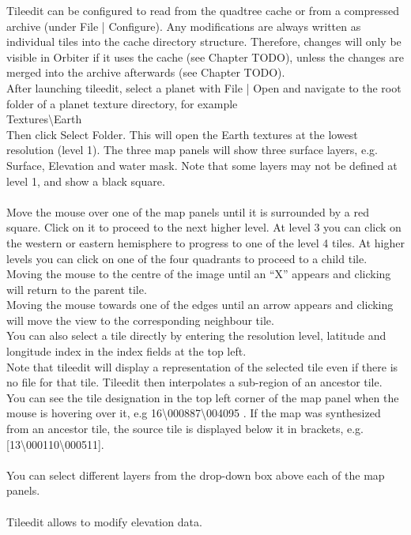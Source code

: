 \documentclass[Orbiter Developer Manual.tex]{subfiles}
\begin{document}
\noindent
Tileedit can be configured to read from the quadtree cache or from a compressed archive (under File | Configure). Any modifications are always written as individual tiles into the cache directory structure. Therefore, changes will only be visible in Orbiter if it uses the cache (see Chapter TODO), unless the changes are merged into the archive afterwards (see Chapter TODO).\\
After launching tileedit, select a planet with File | Open and navigate to the root folder of a planet texture directory, for example\\
\indent Textures\textbackslash Earth\\
Then click Select Folder. This will open the Earth textures at the lowest resolution (level 1). The three map panels will show three surface layers, e.g. Surface, Elevation and water mask. Note that some layers may not be defined at level 1, and show a black square.\\
\\
Move the mouse over one of the map panels until it is surrounded by a red square. Click on it to proceed to the next higher level. At level 3 you can click on the western or eastern hemisphere to progress to one of the level 4 tiles. At higher levels you can click on one of the four quadrants to proceed to a child tile.\\
Moving the mouse to the centre of the image until an “X” appears and clicking will return to the parent tile.\\
Moving the mouse towards one of the edges until an arrow appears and clicking will move the view to the corresponding neighbour tile.\\
You can also select a tile directly by entering the resolution level, latitude and longitude index in the index fields at the top left.\\
Note that tileedit will display a representation of the selected tile even if there is no file for that tile. Tileedit then interpolates a sub-region of an ancestor tile. You can see the tile designation in the top left corner of the map panel when the mouse is hovering over it, e.g 16\textbackslash 000887\textbackslash 004095 . If the map was synthesized from an ancestor tile, the source tile is displayed below it in brackets, e.g. [13\textbackslash 000110\textbackslash 000511].\\
\\
You can select different layers from the drop-down box above each of the map panels.\\
\\
Tileedit allows to modify elevation data.
\end{document}
